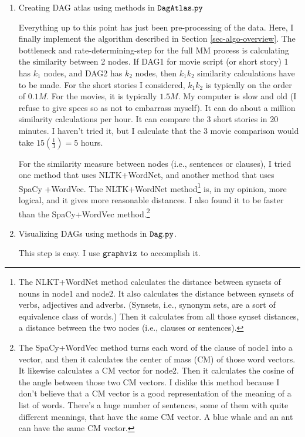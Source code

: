 \documentclass[12pt]{article}
\begin{document}
\begin{enumerate}
\item Creating DAG atlas using methods in
$\tt DagAtlas.py$

Everything up to this point has just been
pre-processing of the data. 
Here, I finally implement the algorithm described
in Section \ref{sec-algo-overview}.
The bottleneck and rate-determining-step for
the full MM process is
calculating the similarity between 2 nodes.
If DAG1 for movie script (or short story) 1 has $k_1$ 
nodes, and DAG2 has $k_2$ nodes,
then $k_1 k_2$ similarity calculations have to be made.
For the short stories I considered, $k_1k_2$
is typically on the order of $0.1M$.
For the movies, it is typically $1.5M$.
My computer is slow and old (I refuse
to give specs so as not to embarrass myself).
It can do about a million similarity calculations per hour. It can compare the 3 short stories in 20 minutes. I haven't tried it, but I calculate that the
3 movie comparison would take $15(\frac{1}{3})=5$ hours.

For the similarity measure between nodes (i.e., sentences or clauses), I tried one method that uses NLTK+WordNet,
and another method that uses SpaCy  +WordVec.
The NLTK+WordNet method\footnote{The NLKT+WordNet method 
calculates the distance between synsets  of nouns
in node1 and node2.  It also calculates the distance between synsets of verbs, adjectives and adverbs. (Synsets, i.e., synonym sets,
are a sort of equivalence class of words.)
Then it calculates from all those synset distances,
a distance between the two nodes (i.e., clauses or sentences).} is, in my
opinion,  more logical, and it gives more reasonable distances. I also found it
to be faster than the SpaCy+WordVec method.\footnote{The
 SpaCy+WordVec method turns 
each word of the clause of node1 into a vector, and then it calculates the center of mass (CM) of those word vectors.
It likewise calculates a CM vector for node2. Then it calculates the cosine of the angle between those two CM vectors. I dislike this method because I don't believe that
a CM vector is a good representation of the
meaning of
a list of words. There's a huge number
of sentences, some
of them with quite different meanings, 
that have the same CM vector.
A blue whale and an ant can have the same CM vector.
}

\item Visualizing DAGs using methods in $\tt Dag.py$.

This step is easy. I use $\tt graphviz$ to 
accomplish it.

\end{enumerate}
\end{document}
